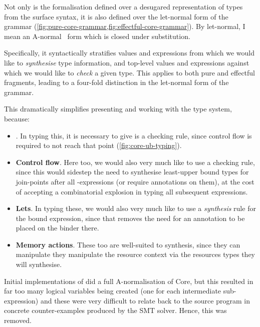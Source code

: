 Not only is the formalisation defined over a desugared representation of types
from the surface  syntax, it is also defined over the let-normal form of
the  grammar
(\cref{fig:pure-core-grammar,fig:effectful-core-grammar}). By let-normal, I
mean an A-normal~ form which is closed under
substitution.

Specifically, it syntactically stratifies values and
expressions from which we would like to \emph{synthesise} type information, and
top-level values and expressions against which we would like to \emph{check} a
given type. This applies to both pure and effectful fragments, leading to a
four-fold distinction in the let-normal form of the grammar.

This dramatically simplifies presenting and working with the type system, because:
\begin{itemize}
    \item {}. In typing this, it is necessary to give is a %
        checking rule, since control flow is required to not reach that point
        (\cref{fig:core-ub-typing}).
    \item \textbf{Control flow}. Here too, we would also very much like to use
        a checking rule, since this would sidestep the need to synthesise
        least-upper bound types for join-points after all 
        -expressions (or require annotations on them), at the
        cost of accepting a combinatorial explosion in typing all subsequent
        expressions.
    \item \textbf{Lets}. In typing these, we would also very much like to use a
        \emph{synthesis} rule for the bound expression, since that removes the
        need for an annotation to be placed on the binder there.
    \item \textbf{Memory actions}. These too are well-suited to synthesis, since
        they can manipulate they manipulate the resource context via the
        resources types they will synthesise.
\end{itemize}

Initial implementations of  did a full A-normalisation of Core, but this resulted
in far too many logical variables being created (one for each intermediate
sub-expression) and these were very difficult to relate back to the source
program in concrete counter-examples produced by the SMT
solver. Hence, this was
removed.\label{sn:rm-anorm}

